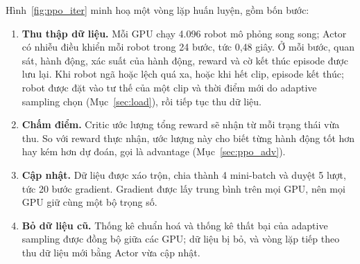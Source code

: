\documentclass[12pt,a4paper,oneside]{report}
\begin{document}
Hình~\ref{fig:ppo_iter} minh hoạ một vòng lặp huấn luyện, gồm bốn bước:
\begin{enumerate}
\item \textbf{Thu thập dữ liệu.} Mỗi GPU chạy 4.096 robot mô phỏng song song; Actor có nhiễu điều khiển mỗi robot trong 24 bước, tức 0,48 giây. Ở mỗi bước, quan sát, hành động, xác suất của hành động, reward và cờ kết thúc episode được lưu lại. Khi robot ngã hoặc lệch quá xa, hoặc khi hết clip, episode kết thúc; robot được đặt vào tư thế của một clip và thời điểm mới do adaptive sampling chọn (Mục~\ref{sec:load}), rồi tiếp tục thu dữ liệu.
\item \textbf{Chấm điểm.} Critic ước lượng tổng reward sẽ nhận từ mỗi trạng thái vừa thu. So với reward thực nhận, ước lượng này cho biết từng hành động tốt hơn hay kém hơn dự đoán, gọi là advantage (Mục~\ref{sec:ppo_adv}).
\item \textbf{Cập nhật.} Dữ liệu được xáo trộn, chia thành 4 mini-batch và duyệt 5 lượt, tức 20 bước gradient. Gradient được lấy trung bình trên mọi GPU, nên mọi GPU giữ cùng một bộ trọng số.
\item \textbf{Bỏ dữ liệu cũ.} Thống kê chuẩn hoá và thống kê thất bại của adaptive sampling được đồng bộ giữa các GPU; dữ liệu bị bỏ, và vòng lặp tiếp theo thu dữ liệu mới bằng Actor vừa cập nhật.
\end{enumerate}
\end{document}
